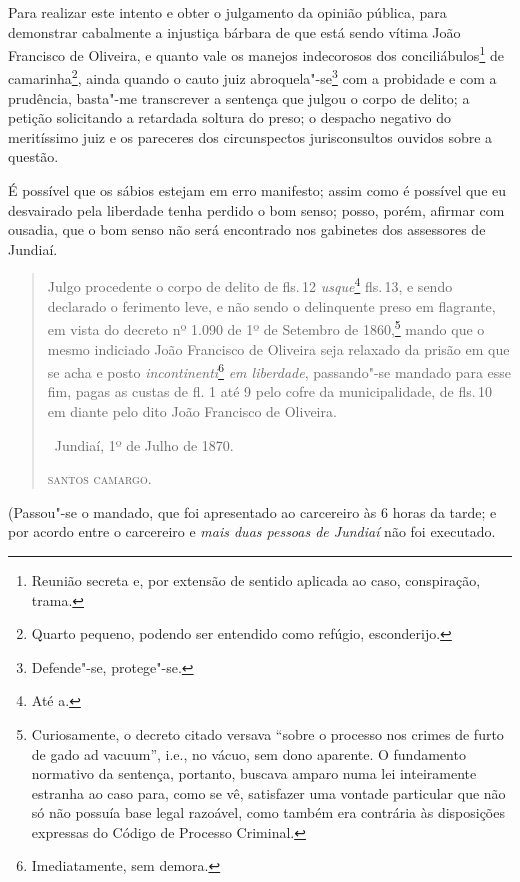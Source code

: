Para realizar este intento e obter o julgamento da opinião pública, para
demonstrar cabalmente a injustiça bárbara de que está sendo vítima João
Francisco de Oliveira, e quanto vale os manejos indecorosos dos
conciliábulos\footnote{Reunião secreta e, por extensão de sentido
  aplicada ao caso, conspiração, trama.} de camarinha\footnote{Quarto
  pequeno, podendo ser entendido como refúgio, esconderijo.}, ainda
quando o cauto juiz abroquela"-se\footnote{Defende"-se, protege"-se.} com
a probidade e com a prudência, basta"-me transcrever a sentença que
julgou o corpo de delito; a petição solicitando a retardada soltura do
preso; o despacho negativo do meritíssimo juiz e os pareceres dos
circunspectos jurisconsultos ouvidos sobre a questão.

É possível que os sábios estejam em erro manifesto; assim como é
possível que eu desvairado pela liberdade tenha perdido o bom senso;
posso, porém, afirmar com ousadia, que o bom senso não será encontrado
nos gabinetes dos assessores de Jundiaí.

\asterisc

\begin{quote}
Julgo procedente o corpo de delito de fls.\,12 \emph{usque}\footnote{Até a.} fls.\,13, e sendo declarado o ferimento leve, e não sendo o
delinquente preso em flagrante, em vista do decreto nº 1.090 de 1º de
Setembro de 1860,\footnote{Curiosamente, o decreto citado versava
  ``sobre o processo nos crimes de furto de gado ad vacuum'', i.e., no
  vácuo, sem dono aparente. O fundamento normativo da sentença,
  portanto, buscava amparo numa lei inteiramente estranha ao caso para,
  como se vê, satisfazer uma vontade particular que não só não possuía
  base legal razoável, como também era contrária às disposições expressas
  do Código de Processo Criminal.} mando que o mesmo indiciado João
Francisco de Oliveira seja relaxado da prisão em que se acha e posto
\emph{incontinenti}\footnote{Imediatamente, sem demora.} \emph{em
liberdade}, passando"-se mandado para esse fim, pagas as custas de fl. 1
até 9 pelo cofre da municipalidade, de fls.\,10 em diante pelo dito João
Francisco de Oliveira.

\medskip

\hfill\ Jundiaí, 1º de Julho de 1870.\smallskip

\hfill\textsc{santos camargo.}
\end{quote}

\noindent(Passou"-se o mandado, que foi apresentado ao carcereiro às 6 horas da
tarde; e por acordo entre o carcereiro e \emph{mais duas pessoas de
Jundiaí} não foi executado.

